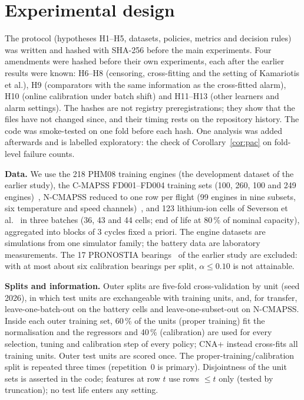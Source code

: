 \section{Experimental design}\label{sec:design}

The protocol (hypotheses H1--H5, datasets, policies, metrics and decision rules) was written and hashed with SHA-256 before the main experiments. Four amendments were hashed before their own experiments, each after the earlier results were known: H6--H8 (censoring, cross-fitting and the setting of Kamariotis et al.), H9 (comparators with the same information as the cross-fitted alarm), H10 (online calibration under batch shift) and H11--H13 (other learners and alarm settings). The hashes are not registry preregistrations; they show that the files have not changed since, and their timing rests on the repository history. The code was smoke-tested on one fold before each hash. One analysis was added afterwards and is labelled exploratory: the check of Corollary~\ref{cor:pac} on fold-level failure counts.

\textbf{Data.} We use the 218 PHM08 training engines (the development dataset of the earlier study), the C-MAPSS FD001--FD004 training sets (100, 260, 100 and 249 engines)~\cite{saxena2008}, N-CMAPSS reduced to one row per flight (99 engines in nine subsets, six temperature and speed channels)~\cite{ariaschao2021}, and 123 lithium-ion cells of Severson et al.~\cite{severson2019} in three batches (36, 43 and 44 cells; end of life at 80\,\% of nominal capacity), aggregated into blocks of 3 cycles fixed a priori. The engine datasets are simulations from one simulator family; the battery data are laboratory measurements. The 17 PRONOSTIA bearings~\cite{nectoux2012} of the earlier study are excluded: with at most about six calibration bearings per split, $\alpha\le0.10$ is not attainable.

\textbf{Splits and information.} Outer splits are five-fold cross-validation by unit (seed 2026), in which test units are exchangeable with training units, and, for transfer, leave-one-batch-out on the battery cells and leave-one-subset-out on N-CMAPSS. Inside each outer training set, 60\,\% of the units (proper training) fit the normalisation and the regressors and 40\,\% (calibration) are used for every selection, tuning and calibration step of every policy; CNA+ instead cross-fits all training units. Outer test units are scored once. The proper-training/calibration split is repeated three times (repetition~0 is primary). Disjointness of the unit sets is asserted in the code; features at row $t$ use rows $\le t$ only (tested by truncation); no test life enters any setting.

